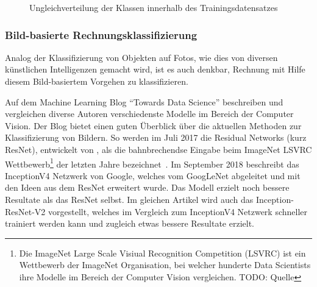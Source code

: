 \begin{figure}[h]
    \captionsetup{width=.8\linewidth}
    \caption{Ungleichverteilung der Klassen innerhalb des Trainingsdatensatzes}
    \label{class-distribution}
    \centering
\end{figure}

\subsubsection{Bild-basierte Rechnungsklassifizierung}


Analog der Klassifizierung von Objekten auf Fotos, wie dies von diversen künstlichen Intelligenzen gemacht wird, ist es auch denkbar, Rechnung mit Hilfe diesem Bild-basiertem Vorgehen zu klassifizieren.

Auf dem Machine Learning Blog \enquote{Towards Data Science} beschreiben und vergleichen diverse Autoren verschiedenste Modelle im Bereich der Computer Vision. Der Blog bietet einen guten Überblick über die aktuellen Methoden zur Klassifizierung von Bildern. So werden im Juli 2017 die Residual Networks (kurz ResNet), entwickelt von \textcite{He2015}, als die bahnbrechendse Eingabe beim ImageNet LSVRC Wettbewerb\footnote{Die ImageNet Large Scale Visiual Recognition Competition (LSVRC) ist ein Wettbewerb der ImageNet Organisation, bei welcher hunderte Data Scientists ihre Modelle im Bereich der Computer Vision vergleichen. TODO: Quelle} der letzten Jahre bezeichnet~\autocite{Fungg2017ResNet}. Im September 2018 beschreibt \textcite{SHTsuang2018Inception} das InceptionV4 Netzwerk von Google, welches vom GoogLeNet abgeleitet und mit den Ideen aus dem ResNet erweitert wurde. Das Modell erzielt noch bessere Resultate als das ResNet selbst. Im gleichen Artikel wird auch das Inception-ResNet-V2 vorgestellt, welches im Vergleich zum InceptionV4 Netzwerk schneller trainiert werden kann und zugleich etwas bessere Resultate erzielt. 

